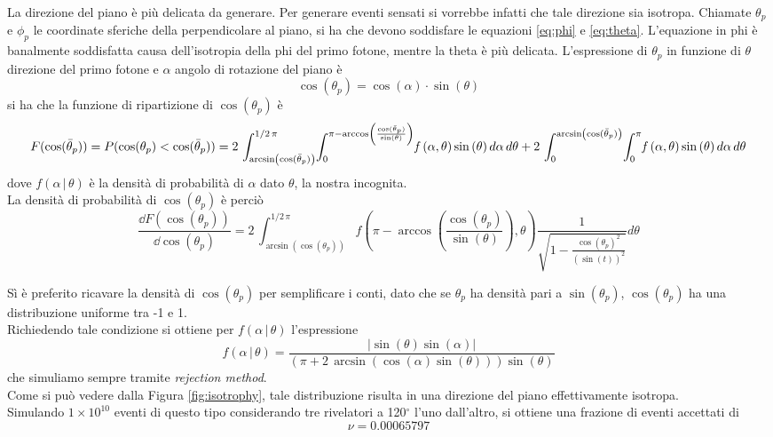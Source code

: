 La direzione del piano è più delicata da generare. Per generare eventi sensati si vorrebbe infatti che tale direzione sia isotropa. Chiamate $\theta_p$ e $\phi_p$ le coordinate sferiche della perpendicolare al piano, si ha che devono soddisfare le equazioni \ref{eq:phi} e \ref{eq:theta}. L'equazione in phi è banalmente soddisfatta causa dell'isotropia della phi del primo fotone, mentre la theta è più delicata.
L'espressione di $\theta_p$ in funzione di $\theta$ direzione del primo fotone e $\alpha$ angolo di rotazione del piano è
\begin{equation}
	\cos(\theta_p)=\cos(\alpha)\cdot\sin(\theta)
\end{equation}
si ha che la funzione di ripartizione di $\cos(\theta_p)$ è
\begin{equation}
	F(\cos(\bar\theta_p)) = P(\cos(\theta_p) < \cos(\bar\theta_p)) = 2\,\int _{\arcsin \left( \cos(\bar\theta_p) \right) }^{1/2\,\pi }\!\int _{0}^{\pi -\arccos \left( {\frac {\cos(\bar\theta_p)}{\sin \left( \theta \right) }} \right) }\!{\it f} \left( \alpha,\theta \right) \sin \left( \theta \right) {d\alpha}\,{d\theta}+2\,\int _{0}^{\arcsin \left( \cos(\bar\theta_p) \right) }\!\int _{0}^{\pi }\!{\it f} \left( \alpha,\theta \right) \sin \left( \theta \right) {d\alpha}\,{d\theta}
\end{equation}
dove $f(\alpha\,|\,\theta)$ è la densità di probabilità di $\alpha$ dato $\theta$, la nostra incognita.\\
La densità di probabilità di $\cos(\theta_p)$ è perciò
\begin{equation}
	\frac{\dd F(\cos(\theta_p))}{\dd\cos(\theta_p)} = 2\,\int _{\arcsin \left( \cos(\theta_p) \right) }^{1/2\,\pi }\!f \left( \pi -\arccos \left( {\frac {\cos(\theta_p)}{\sin \left( \theta \right) }} \right) ,\theta \right) {\frac {1}{\sqrt {1-{\frac {{\cos(\theta_p)}^{2}}{ \left( \sin \left( t \right)  \right) ^{2}}}}}}{d\theta}
\end{equation}

Sì è preferito ricavare la densità di $\cos(\theta_p)$ per semplificare i conti, dato che se $\theta_p$ ha densità pari a $\sin(\theta_p)$, $\cos(\theta_p)$ ha una distribuzione uniforme tra -1 e 1.\\
Richiedendo tale condizione si ottiene per $f(\alpha\,|\,\theta)$ l'espressione
\begin{equation}
	f(\alpha\,|\,\theta) = {\frac { \left| \sin \left( \theta \right) \sin \left( \alpha \right) 
 \right| }{ \left( \pi +2\,\arcsin \left( \cos \left( \alpha \right) 
\sin \left( \theta \right)  \right)  \right) \sin \left( \theta
 \right) }}
\end{equation}
che simuliamo sempre tramite \textit{rejection method}.\\
Come si può vedere dalla Figura \ref{fig:isotrophy}, tale distribuzione risulta in una direzione del piano effettivamente isotropa.\\


Simulando $1\times 10^{10}$ eventi di questo tipo considerando tre rivelatori a 120$^\circ$ l'uno dall'altro, si ottiene una frazione di eventi accettati di 
$$\nu=0.00065797$$


